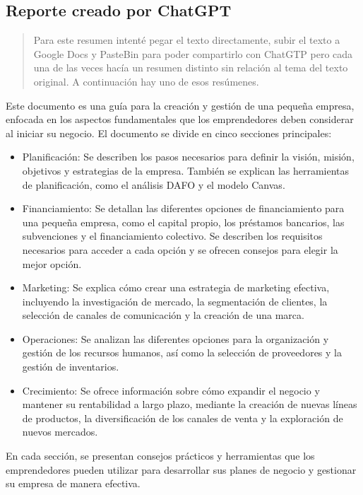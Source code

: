\newpage
\subsection*{Reporte creado por ChatGPT}
	\begin{quote}
		Para este resumen intenté pegar el texto directamente, subir el texto a Google Docs y PasteBin para poder compartirlo con ChatGTP pero cada una de las veces hacía un resumen distinto sin relación al tema del texto original. A continuación hay uno de esos resúmenes.
	\end{quote}
	\noindent Este documento es una guía para la creación y gestión de una pequeña empresa, enfocada en los aspectos fundamentales que los emprendedores deben considerar al iniciar su negocio. El documento se divide en cinco secciones principales:\\
	\begin{itemize}
		\item Planificación: Se describen los pasos necesarios para definir la visión, misión, objetivos y estrategias de la empresa. También se explican las herramientas de planificación, como el análisis DAFO y el modelo Canvas.
		\item Financiamiento: Se detallan las diferentes opciones de financiamiento para una pequeña empresa, como el capital propio, los préstamos bancarios, las subvenciones y el financiamiento colectivo. Se describen los requisitos necesarios para acceder a cada opción y se ofrecen consejos para elegir la mejor opción.
		\item Marketing: Se explica cómo crear una estrategia de marketing efectiva, incluyendo la investigación de mercado, la segmentación de clientes, la selección de canales de comunicación y la creación de una marca.
		\item Operaciones: Se analizan las diferentes opciones para la organización y gestión de los recursos humanos, así como la selección de proveedores y la gestión de inventarios.
		\item Crecimiento: Se ofrece información sobre cómo expandir el negocio y mantener su rentabilidad a largo plazo, mediante la creación de nuevas líneas de productos, la diversificación de los canales de venta y la exploración de nuevos mercados.
	\end{itemize}
	
	En cada sección, se presentan consejos prácticos y herramientas que los emprendedores pueden utilizar para desarrollar sus planes de negocio y gestionar su empresa de manera efectiva.

\newpage
